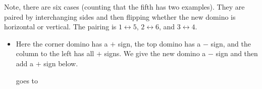 \documentclass[12pt]{article}
\numberwithin{equation}{section}
\newcommand{\horizontalDominoRSShift}[4]{\filldraw [dominoRSStyle] (#2 - 1 + #4 + \eps, #1 - 1 + \eps) rectangle + (2 - \teps, 1 -\teps) node [dominoText] {$#3$};}
\newcommand{\verticalDominoRSShift}[4]{\filldraw [dominoRSStyle] (#2 - 1 + #4 + \eps,  #1 - 1 + \eps) rectangle + (1 - \teps,2 -\teps) node [dominoText] {$#3$};}
\begin{document}
\begin{itemize}
    Note, there are six cases (counting that the fifth has two examples).
    They are paired by interchanging sides and then flipping whether the new domino is horizontal or vertical.
    The pairing is $1 \leftrightarrow 5$, $2 \leftrightarrow 6$, and $3 \leftrightarrow 4$.
    \begin{itemize}
      \item Here the corner domino has a $+$ sign, the top domino has a $-$ sign, and the column to the left has all $+$ signs.
      We give the new domino a $-$ sign and then add a $+$ sign below.
      \begin{figure}[H]
        \centering
      \end{figure}
      goes to
      \begin{figure}[H]
        \centering
      \end{figure}


\end{itemize}
\end{itemize}
\end{document}
